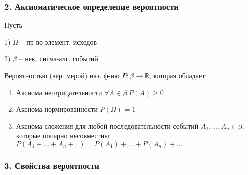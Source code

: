 \subsubsection*{2. Аксиоматическое определение вероятности}

Пусть

1) $\Omega$ -- пр-во элемент. исходов 

2) $\beta$ -- нек. сигма-алг. событий

\OPR Вероятностью (вер. мерой) наз. ф-ию $P:\beta\rightarrow\mathbb{R}$, которая обладает:
\begin{enumerate}[topsep=0pt, leftmargin=20pt, noitemsep, label=\arabic*\degree]
	\item Аксиома неотрицательности $\forall A\in \beta~P(A)\geq 0$
	
	\item Аксиома нормированности $P(\Omega) = 1$
	
	\item Аксиома сложения для любой последовательности событий $A_1,...,A_n\in \beta$, которые попарно несовместны: $P(A_1+...+A_n+..)=P(A_1)+...+P(A_n)+...$
	
\end{enumerate}

\clearpage

\subsubsection*{3. Свойства вероятности}

